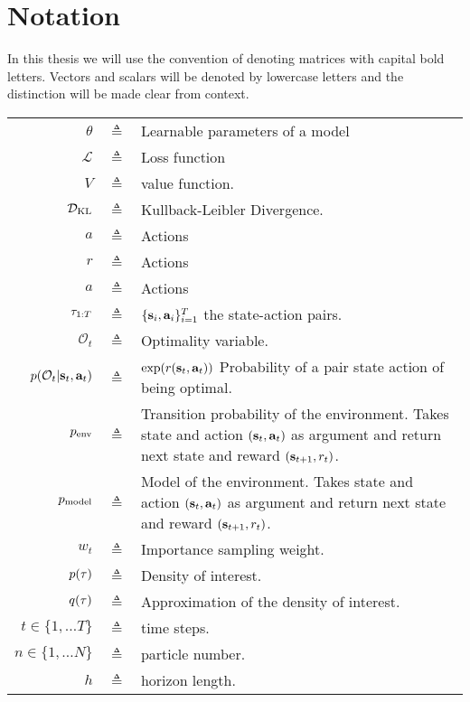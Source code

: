 \chapter*{Notation}
In this thesis we will use the convention of denoting matrices with capital bold letters. Vectors and scalars will be denoted by lowercase letters and the distinction will be made clear from context.
\begin{table}[H]%
\begin{center}%
\begin{tabular}{r c p{10cm} }
\toprule
$\theta$ & $\triangleq$ & Learnable parameters of a model\\
$\mathcal{L}$ & $\triangleq$ & Loss function\\
$V$  & $\triangleq$ & value function.\\
${\mathcal{D}}_{\mathrm{KL}}$ & $\triangleq$ & Kullback-Leibler Divergence. \\
$a$  & $\triangleq$ & Actions\\
$r$  & $\triangleq$ & Actions\\
$a$  & $\triangleq$ & Actions\\




$\tau_{1:T}$ & $\triangleq$ & $\{{\mathbf{s}}_i, {\mathbf{a}}_i\}_{i=1}^T$ the state-action pairs.\\

$\mathcal{O}_t$ & $\triangleq$ & Optimality variable.\\
$p(\mathcal{O}_t|{\mathbf{s}}_t, {\mathbf{a}}_t)$ & $\triangleq$ & $\exp(r({\mathbf{s}}_t, {\mathbf{a}}_t))$ Probability of a pair state action of being optimal.\\
$p_{\text{env}}$ & $\triangleq$ & Transition probability of the environment. Takes state and action $({\mathbf{s}}_t, {\mathbf{a}}_t)$ as argument and return next state and reward $({\mathbf{s}}_{t+1}, r_t)$.\\
$p_{\rm{model}}$ & $\triangleq$ & Model of the environment. Takes state and action $({\mathbf{s}}_t, {\mathbf{a}}_t)$ as argument and return next state and reward $({\mathbf{s}}_{t+1}, r_t)$.\\
$w_t$ & $\triangleq$ & Importance sampling weight.\\ 
$p(\tau)$  & $\triangleq$ & Density of interest.\\
$q(\tau)$  & $\triangleq$ & Approximation of the density of interest.\\
$t \in \{1, \ldots T\}$ & $\triangleq$ & time steps. \\
$n \in \{1, \ldots N\}$ & $\triangleq$ & particle number. \\
$h$ & $\triangleq$ & horizon length. \\

\bottomrule
\end{tabular}
\end{center}
\label{tab:notation}
\end{table}


